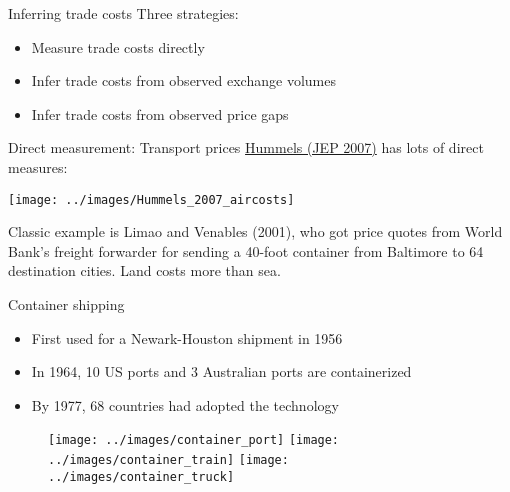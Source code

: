 \documentclass[10pt,notes=hide,aspectratio=169]{beamer}
\begin{document}
\begin{frame}{Inferring trade costs}
Three strategies:
\begin{itemize}
	\item Measure trade costs directly
	\item Infer trade costs from observed exchange volumes
	\item Infer trade costs from observed price gaps
\end{itemize}
\end{frame}
\begin{frame}{Direct measurement: Transport prices}
\href{https://www.aeaweb.org/articles?id=10.1257/jep.21.3.131}{Hummels (JEP 2007)} has lots of direct measures:
\begin{center}
\texttt{[image: ../images/Hummels\_2007\_aircosts]}
\end{center}
Classic example is Limao and Venables (2001), who got price quotes from World Bank's freight forwarder for sending a 40-foot container from Baltimore to 64 destination cities.
Land costs more than sea.
\end{frame}
\begin{frame}{Container shipping}
\begin{itemize}
	\item First used for a Newark-Houston shipment in 1956 %
	\item In 1964, 10 US ports and 3 Australian ports are containerized %
	\item By 1977, 68 countries had adopted the technology
\end{itemize}
\begin{center}\begin{figure}
	\texttt{[image: ../images/container\_port]} \hfill
	\texttt{[image: ../images/container\_train]} \hfill
	\texttt{[image: ../images/container\_truck]}
\end{figure}  \end{center}
\end{frame}
\end{document}
